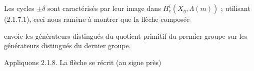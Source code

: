 Les cycles  $\pm \delta$  sont caractérisés par leur image dans  $H^{i}_{c}(X_{\bar{\eta}},\Lambda(m))$ ; utilisant (2.1.7.1), ceci nous ramène à montrer que la flèche composée

\begin{center}
\end{center}
envoie les générateurs distingués du quotient primitif du premier groupe sur les générateurs distingués du dernier groupe.

Appliquons 2.1.8. La flèche se récrit (au signe près)

